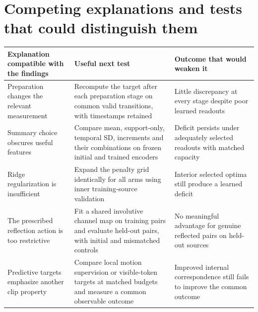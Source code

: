 \documentclass{article}
\begin{document}
\section{Competing explanations and tests that could distinguish them}\label{appendix-b.-competing-explanations-and-tests-that-could-distinguish-them}

\begin{table}[htbp]
\centering
\small
\begin{tabular}{@{}
  >{\raggedright\arraybackslash}p{}
  >{\raggedright\arraybackslash}p{}
  >{\raggedright\arraybackslash}p{}@{}}
\toprule\noalign{}
\begin{minipage}[b]{\linewidth}\raggedright
Explanation compatible with the findings
\end{minipage} & \begin{minipage}[b]{\linewidth}\raggedright
Useful next test
\end{minipage} & \begin{minipage}[b]{\linewidth}\raggedright
Outcome that would weaken it
\end{minipage} \\
\midrule\noalign{}

Preparation changes the relevant measurement & Recompute the target after each preparation stage on common valid transitions, with timestamps retained & Little discrepancy at every stage despite poor learned readouts \\
Summary choice obscures useful features & Compare mean, support-only, temporal SD, increments and their combinations on frozen initial and trained encoders & Deficit persists under adequately selected readouts with matched capacity \\
Ridge regularization is insufficient & Expand the penalty grid identically for all arms using inner training-source validation & Interior selected optima still produce a learned deficit \\
The prescribed reflection action is too restrictive & Fit a shared involutive channel map on training pairs and evaluate held-out pairs, with initial and mismatched controls & No meaningful advantage for genuine reflected pairs on held-out sources \\
Predictive targets emphasize another clip property & Compare local motion supervision or visible-token targets at matched budgets and measure a common observable outcome & Improved internal correspondence still fails to improve the common outcome \\
\bottomrule
\end{tabular}
\end{table}
\end{document}
